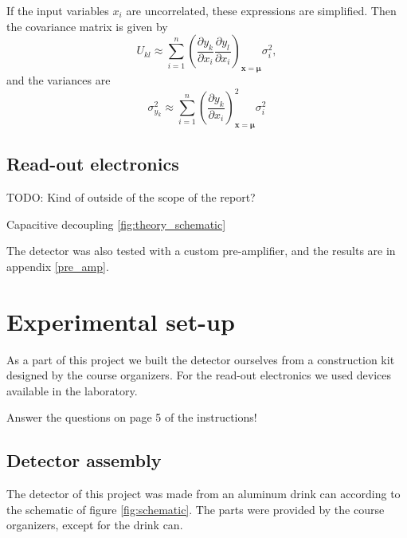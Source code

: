 \documentclass[a4paper]{article}
\begin{document}
If the input variables $x_i$ are uncorrelated, these expressions are simplified.
Then the covariance matrix is given by
\begin{equation}
U_{kl} \approx \sum_{i=1}^n \left( \frac{\partial y_k}{\partial x_i} \frac{\partial y_l}{\partial x_i} \right)_{\mathbf{x}=\mathbf{\mu}} \sigma_i^2,
\end{equation}
and the variances are
\begin{equation}
\sigma_{y_k}^2 \approx \sum_{i=1}^n \left( \frac{\partial y_k}{\partial x_i} \right)_{\mathbf{x}=\mathbf{\mu}}^2 \sigma_i^2
\end{equation}
\cite[p. 20--22]{cowan_statistical_1998}


\subsection{Read-out electronics}
\label{electronics}

TODO: Kind of outside of the scope of the report?

Capacitive decoupling \ref{fig:theory_schematic}

The detector was also tested with a custom pre-amplifier, and the results are in appendix \ref{pre_amp}.



\section{Experimental set-up}
\label{setup}
As a part of this project we built the detector ourselves from a construction kit designed by the course organizers.
For the read-out electronics we used devices available in the laboratory.

Answer the questions on page 5 of the instructions!


\subsection{Detector assembly}
\label{assembly}
The detector of this project was made from an aluminum drink can according to the schematic of figure \ref{fig:schematic}.
The parts were provided by the course organizers, except for the drink can.
\end{document}
